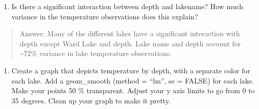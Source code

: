 \documentclass[]{article}
\newenvironment{Shaded}{\begin{snugshade}}{\end{snugshade}}
\newcommand{\CommentTok}[1]{\textcolor[rgb]{0.56,0.35,0.01}{\textit{#1}}}
\newcommand{\DataTypeTok}[1]{\textcolor[rgb]{0.13,0.29,0.53}{#1}}
\newcommand{\DecValTok}[1]{\textcolor[rgb]{0.00,0.00,0.81}{#1}}
\newcommand{\FloatTok}[1]{\textcolor[rgb]{0.00,0.00,0.81}{#1}}
\newcommand{\KeywordTok}[1]{\textcolor[rgb]{0.13,0.29,0.53}{\textbf{#1}}}
\newcommand{\NormalTok}[1]{#1}
\newcommand{\OperatorTok}[1]{\textcolor[rgb]{0.81,0.36,0.00}{\textbf{#1}}}
\newcommand{\OtherTok}[1]{\textcolor[rgb]{0.56,0.35,0.01}{#1}}
\newcommand{\StringTok}[1]{\textcolor[rgb]{0.31,0.60,0.02}{#1}}
\providecommand{\tightlist}{%
  \setlength{\itemsep}{0pt}\setlength{\parskip}{0pt}}
\begin{document}
\begin{enumerate}
\def\labelenumi{\arabic{enumi}.}
\setcounter{enumi}{6}
\tightlist
\item
  Is there a significant interaction between depth and lakename? How
  much variance in the temperature observations does this explain?
\end{enumerate}

\begin{quote}
Answer: Many of the different lakes have a significant interaction with
depth except Ward Lake and depth. Lake name and depth account for
\textasciitilde{}72\% variance in lake temperature observations.
\end{quote}

\begin{enumerate}
\def\labelenumi{\arabic{enumi}.}
\setcounter{enumi}{7}
\tightlist
\item
  Create a graph that depicts temperature by depth, with a separate
  color for each lake. Add a geom\_smooth (method = ``lm'', se = FALSE)
  for each lake. Make your points 50 \% transparent. Adjust your y axis
  limits to go from 0 to 35 degrees. Clean up your graph to make it
  pretty.
\end{enumerate}

\begin{Shaded}
\end{Shaded}
\end{document}
